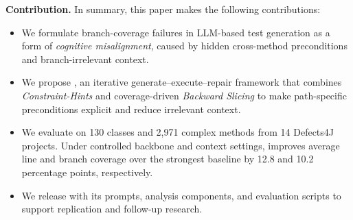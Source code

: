 \textbf{Contribution.}
In summary, this paper makes the following contributions:
\begin{itemize}[leftmargin=*]
\item We formulate branch-coverage failures in LLM-based test generation as a form of \emph{cognitive misalignment}, caused by hidden cross-method preconditions and branch-irrelevant context.

\item We propose \ourmethod{}, an iterative generate--execute--repair framework that combines \emph{Constraint-Hints} and coverage-driven \emph{Backward Slicing} to make path-specific preconditions explicit and reduce irrelevant context.

\item We evaluate \ourmethod{} on 130 classes and 2{,}971 complex methods from 14 Defects4J projects. Under controlled backbone and context settings, \ourmethod{} improves average line and branch coverage over the strongest baseline by 12.8 and 10.2 percentage points, respectively.

\item We release \ourmethod{} with its prompts, analysis components, and evaluation scripts to support replication and follow-up research.
\end{itemize}
